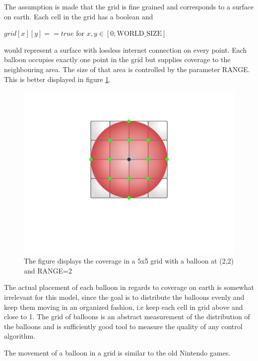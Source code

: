 The assumption is made that the grid is fine grained and corresponds to a surface on earth. Each cell in the grid has a boolean and 

    $grid[x][y] == true$ for $x,y\in [0;\text{WORLD\_SIZE}]$
    
would represent a surface with lossless internet connection on every point. Each balloon occupies exactly one point in the grid but supplies coverage to the neighbouring area. The size of that area is controlled by the parameter RANGE. This is better displayed in figure \ref{fig:gridAssupmtions}.
\begin{figure}[H]
    \centering
    \includegraphics[width=\textwidth, trim=4cm 6cm 4cm 3cm, clip]{graphics/coverage.pdf}
    \caption{The figure displays the coverage in a 5x5 grid with a balloon at (2,2) and RANGE=2}
    \label{fig:gridAssupmtions}
\end{figure}
The actual placement of each balloon in regards to coverage on earth is somewhat irrelevant for this model, since the goal is to distribute the balloons evenly and keep them moving in an organized fashion, i.e keep each cell in grid above and close to 1. The grid of balloons is an abstract measurement of the distribution of the balloons and is sufficiently good tool to measure the quality of any control algorithm. 

The movement of a balloon in a grid is similar to the old Nintendo games. 

